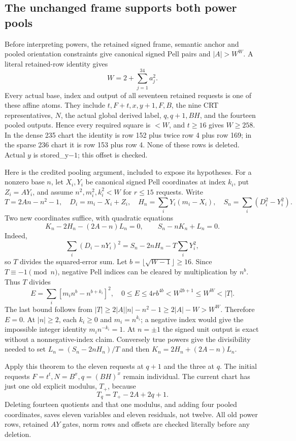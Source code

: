 \subsection{The unchanged frame supports both power pools}
Before interpreting powers, the retained signed frame, semantic anchor and
pooled orientation constraints give canonical signed Pell pairs and
$|A|>W^W$. A literal retained-row identity gives
\[
 W=2+\sum_{j=1}^{34}a_j^2.
\]
Every actual base, index and output of all seventeen retained requests is
one of these affine atoms. They include $t,F+t,x,y+1,F,B$, the nine CRT
representatives, $N$, the actual global derived label, $q,q+1,BH$, and the
fourteen pooled outputs. Hence every required square is $<W$, and $t\ge16$
gives $W\ge258$. In the dense 235 chart the identity is row 152 plus twice
row 4 plus row 169; in the sparse 236 chart it is row 153 plus row 4. None of
these rows is deleted. Actual $y$ is stored\_y$-1$; this offset is checked.

Here is the credited pooling argument, included to expose its hypotheses.
For a nonzero base $n$, let $X_i,Y_i$ be canonical signed Pell coordinates
at index $k_i$, put $Z_i=AY_i$, and assume $n^2,m_i^2,k_i^2<W$ for $r\le15$
requests. Write
\[
 T=2An-n^2-1,\quad D_i=m_i-X_i+Z_i,\quad
 H_n=\sum_iY_i(m_i-X_i),\quad S_n=\sum_i(D_i^2-Y_i^2).
\]
Two new coordinates suffice, with quadratic equations
\begin{equation}\label{eq:r21-power-pool}
 K_n-2H_n-(2A-n)L_n=0,\qquad S_n-nK_n+L_n=0.
\end{equation}
Indeed,
\[
 \sum_i(D_i-nY_i)^2=S_n-2nH_n-T\sum_iY_i^2,
\]
so $T$ divides the squared-error sum. Let
$b=\lfloor\sqrt{W-1}\rfloor\ge16$. Since $T\equiv-1\pmod n$, negative
Pell indices can be cleared by multiplication by $n^b$. Thus $T$ divides
\[
 E=\sum_i[m_i n^b-n^{b+k_i}]^2,
 \quad 0\le E\le4r b^{4b}<W^{2b+1}\le W^W<|T|.
\]
The last bound follows from
$|T|\ge2|A||n|-n^2-1\ge2|A|-W>W^W$.
Therefore $E=0$. At $|n|\ge2$, each $k_i\ge0$ and $m_i=n^{k_i}$;
a negative index would give the impossible integer identity
$m_i n^{-k_i}=1$. At $n=\pm1$ the signed unit output is exact without a
nonnegative-index claim. Conversely true powers give the divisibility
needed to set $L_n=(S_n-2nH_n)/T$ and then $K_n=2H_n+(2A-n)L_n$.

Apply this theorem to the eleven requests at $q+1$ and the three at $q$.
The initial requests $F=t^t,N=B^x,q=(BH)^x$ remain individual. The current
chart has just one old explicit modulus, $T_+$, because
\[
 T_q=T_+-2A+2q+1.
\]
Deleting fourteen quotients and that one modulus, and adding four pooled
coordinates, saves eleven variables and eleven residuals, not twelve.
All old power rows, retained $AY$ gates, norm rows and offsets are checked
literally before any deletion.

